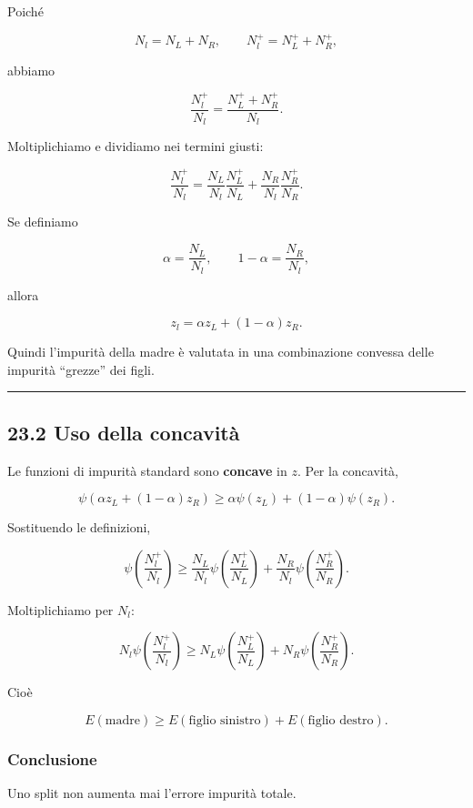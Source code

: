 \documentclass[
]{article}
\begin{document}
Poiché

\[
N_l=N_L+N_R,
\qquad
N_l^+=N_L^+ + N_R^+,
\]

abbiamo

\[
\frac{N_l^+}{N_l}
=
\frac{N_L^+ + N_R^+}{N_l}.
\]

Moltiplichiamo e dividiamo nei termini giusti:

\[
\frac{N_l^+}{N_l}
=
\frac{N_L}{N_l}\frac{N_L^+}{N_L}
+
\frac{N_R}{N_l}\frac{N_R^+}{N_R}.
\]

Se definiamo

\[
\alpha=\frac{N_L}{N_l},
\qquad
1-\alpha=\frac{N_R}{N_l},
\]

allora

\[
z_l = \alpha z_L + (1-\alpha)z_R.
\]

Quindi l'impurità della madre è valutata in una combinazione convessa
delle impurità ``grezze'' dei figli.

\begin{center}\rule{0.5\linewidth}{0.5pt}\end{center}

\subsection{23.2 Uso della concavità}\label{uso-della-concavituxe0}

Le funzioni di impurità standard sono \textbf{concave} in \(z\). Per la
concavità,

\[
\psi(\alpha z_L + (1-\alpha)z_R)
\ge
\alpha\psi(z_L)+(1-\alpha)\psi(z_R).
\]

Sostituendo le definizioni,

\[
\psi\left(\frac{N_l^+}{N_l}\right)
\ge
\frac{N_L}{N_l}\psi\left(\frac{N_L^+}{N_L}\right)
+
\frac{N_R}{N_l}\psi\left(\frac{N_R^+}{N_R}\right).
\]

Moltiplichiamo per \(N_l\):

\[
N_l\psi\left(\frac{N_l^+}{N_l}\right)
\ge
N_L\psi\left(\frac{N_L^+}{N_L}\right)
+
N_R\psi\left(\frac{N_R^+}{N_R}\right).
\]

Cioè

\[
E(\text{madre}) \ge E(\text{figlio sinistro}) + E(\text{figlio destro}).
\]

\subsubsection{Conclusione}\label{conclusione-13}

Uno split non aumenta mai l'errore impurità totale.
\end{document}
